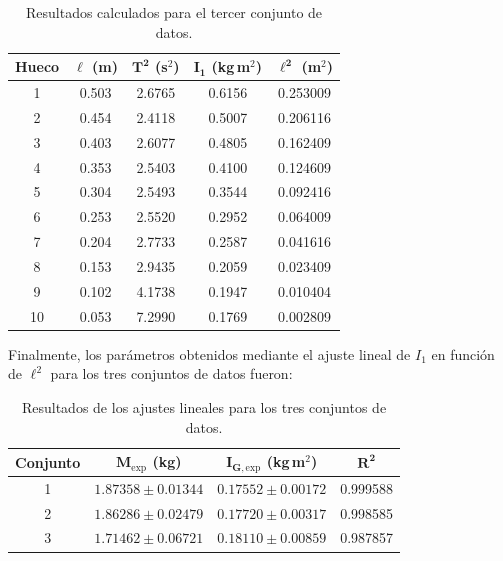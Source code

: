 \documentclass[11pt,a4paper]{article}
\begin{document}
\begin{table}[H]
    \centering
    \small
    \renewcommand{\arraystretch}{1.05}
    \setlength{\tabcolsep}{7pt}

    \begin{tabular}{ccccc}
        \toprule
        \textbf{Hueco} &
        $\boldsymbol{\ell}$ \textbf{(m)} &
        $\boldsymbol{T^2}$ \textbf{(s$^2$)} &
        $\boldsymbol{I_1}$ \textbf{(kg\,m$^2$)} &
        $\boldsymbol{\ell^2}$ \textbf{(m$^2$)} \\
        \midrule
        1  & 0.503 & 2.6765 & 0.6156 & 0.253009 \\
        2  & 0.454 & 2.4118 & 0.5007 & 0.206116 \\
        3  & 0.403 & 2.6077 & 0.4805 & 0.162409 \\
        4  & 0.353 & 2.5403 & 0.4100 & 0.124609 \\
        5  & 0.304 & 2.5493 & 0.3544 & 0.092416 \\
        6  & 0.253 & 2.5520 & 0.2952 & 0.064009 \\
        7  & 0.204 & 2.7733 & 0.2587 & 0.041616 \\
        8  & 0.153 & 2.9435 & 0.2059 & 0.023409 \\
        9  & 0.102 & 4.1738 & 0.1947 & 0.010404 \\
        10 & 0.053 & 7.2990 & 0.1769 & 0.002809 \\
        \bottomrule
    \end{tabular}

    \caption{Resultados calculados para el tercer conjunto de datos.}
    \label{tab:resultados_integrante3}
\end{table}

Finalmente, los parámetros obtenidos mediante el ajuste lineal de
$I_1$ en función de $\ell^2$ para los tres conjuntos de datos fueron:

\begin{table}[H]
    \centering
    \small
    \renewcommand{\arraystretch}{1.15}

    \begin{tabular}{cccc}
        \toprule
        \textbf{Conjunto} &
        $\boldsymbol{M_{\mathrm{exp}}}$ \textbf{(kg)} &
        $\boldsymbol{I_{G,\mathrm{exp}}}$ \textbf{(kg\,m$^2$)} &
        $\boldsymbol{R^2}$ \\
        \midrule

        1 &
        $1.87358\pm0.01344$ &
        $0.17552\pm0.00172$ &
        0.999588 \\

        2 &
        $1.86286\pm0.02479$ &
        $0.17720\pm0.00317$ &
        0.998585 \\

        3 &
        $1.71462\pm0.06721$ &
        $0.18110\pm0.00859$ &
        0.987857 \\

        \bottomrule
    \end{tabular}

    \caption{Resultados de los ajustes lineales para los tres conjuntos de datos.}
    \label{tab:resultados_tres_integrantes}
\end{table}
\end{document}
